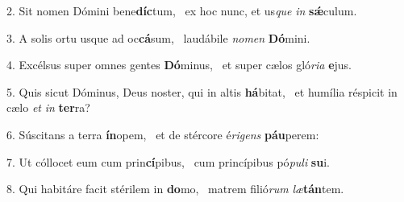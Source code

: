 2. Sit nomen Dómini bene\textbf{díc}tum, \ast\  ex hoc nunc, et us\textit{que} \textit{in} \textbf{sǽ}culum.\

3. A solis ortu usque ad oc\textbf{cá}sum, \ast\  laudábile \textit{no}\textit{men} \textbf{Dó}mini.\

4. Excélsus super omnes gentes \textbf{Dó}minus, \ast\  et super cælos gló\textit{ri}\textit{a} \textbf{e}jus.\

5. Quis sicut Dóminus, Deus noster, qui in altis \textbf{há}bitat, \ast\  et humília réspicit in cælo \textit{et} \textit{in} \textbf{ter}ra?\

6. Súscitans a terra \textbf{ín}opem, \ast\  et de stércore é\textit{ri}\textit{gens} \textbf{páu}perem:\

7. Ut cóllocet eum cum prin\textbf{cí}pibus, \ast\  cum princípibus pó\textit{pu}\textit{li} \textbf{su}i.\

8. Qui habitáre facit stérilem in \textbf{do}mo, \ast\  matrem filió\textit{rum} \textit{læ}\textbf{tán}tem.\

